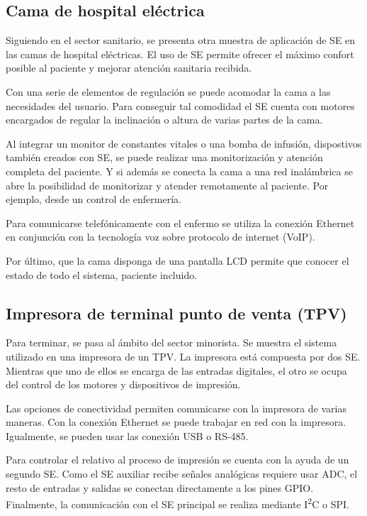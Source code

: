 \subsection{Cama de hospital eléctrica}{\label{sec:cama}}
Siguiendo en el sector sanitario, se presenta otra muestra de aplicación de SE
en las camas de hospital eléctricas. El uso de SE permite ofrecer el 
máximo confort posible al paciente y mejorar atención sanitaria recibida.

Con una serie de elementos de regulación se puede acomodar la cama a las
necesidades del usuario. Para conseguir tal comodidad el SE cuenta con motores
encargados de regular la inclinación o altura de varias partes de la cama. 

Al integrar un monitor de constantes vitales o una bomba de infusión, 
dispostivos también creados con SE, se puede realizar una monitorización y 
atención completa del paciente. Y si además se conecta la cama a una red
inalámbrica se abre la posibilidad de monitorizar y atender remotamente al
paciente. Por ejemplo, desde un control de enfermería.

Para comunicarse telefónicamente con el enfermo se utiliza la conexión
Ethernet en conjunción con la tecnología voz sobre protocolo de internet (VoIP).

Por último, que la cama disponga de una pantalla LCD permite que conocer 
 el estado de todo el sistema, paciente incluido.


\subsection{Impresora de terminal punto de venta (TPV)}{\label{sec:tpv}}
Para terminar, se pasa al ámbito del sector minorista. Se muestra el sistema
utilizado en una impresora de un TPV. La impresora está compuesta por
dos SE. Mientras que uno de ellos se encarga de las entradas digitales, el
otro se ocupa del control de los motores y dispositivos de impresión.

Las opciones de conectividad permiten comunicarse con la impresora de varias
maneras. Con la conexión Ethernet se puede trabajar en red con la impresora.
Igualmente, se pueden usar las conexión USB o RS-485.

Para controlar el  relativo al proceso de impresión
se cuenta con la ayuda de un segundo SE. Como el SE auxiliar recibe señales
analógicas requiere usar ADC, el resto de entradas y salidas se conectan
directamente a los pines GPIO. Finalmente, la comunicación con el SE principal
se realiza mediante I\textsuperscript{2}C o SPI.

